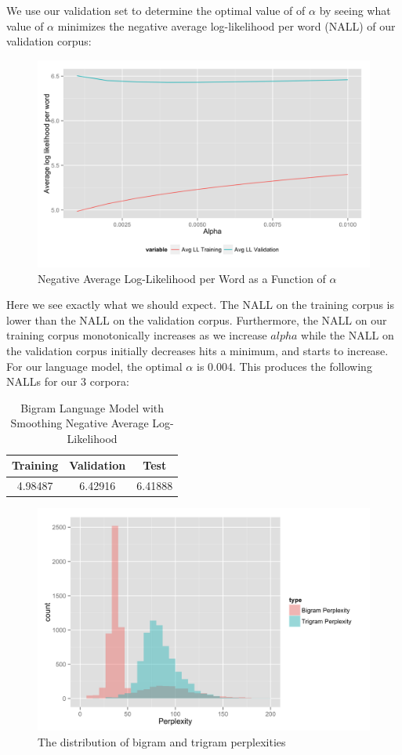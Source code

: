 \documentclass[fleqn,12pt]{SelfArx} %
\begin{document}
We use our validation set to determine the optimal value of of $\alpha$ by seeing what value of $\alpha$ minimizes the negative average log-likelihood per word (NALL) of our validation corpus:
\begin{figure}[ht]\centering
\includegraphics[width=\linewidth]{bigram_add_a.png}
\caption{Negative Average Log-Likelihood per Word as a Function of $\alpha$}
\label{fig:fre_hist}
\end{figure}
Here we see exactly what we should expect. The NALL on the training corpus is lower than the NALL on the validation corpus. Furthermore, the NALL on our training corpus monotonically increases as we increase $alpha$ while the NALL on the validation corpus initially decreases hits a minimum, and starts to increase. For our language model, the optimal $\alpha$ is 0.004. This produces the following NALLs for our 3 corpora:

\begin{table}[hbt]
\caption{Bigram Language Model with Smoothing Negative Average Log-Likelihood}
\centering
\begin{tabular}{ccc}
\toprule
Training &  Validation & Test\\
\midrule
4.98487 & 6.42916 &  6.41888\\
\bottomrule
\end{tabular}
\end{table}

\begin{figure}
\includegraphics[width=\linewidth]{perplexity.png}
\caption{The distribution of bigram and trigram perplexities}
\label{fig:perp_hist}
\end{figure}
\end{document}
